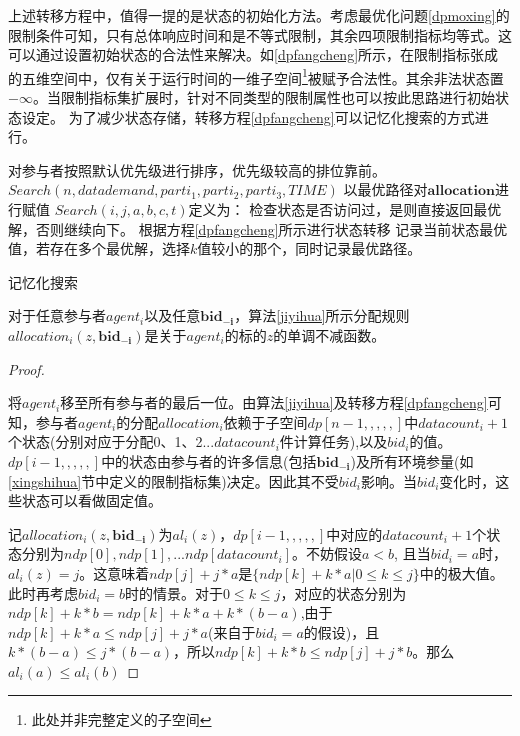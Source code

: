 \documentclass[promaster]{thesis-uestc}
\begin{document}
上述转移方程中，值得一提的是状态的初始化方法。考虑最优化问题\ref{dpmoxing}的限制条件可知，只有总体响应时间和是不等式限制，其余四项限制指标均等式。这可以通过设置初始状态的合法性来解决。如\ref{dpfangcheng}所示，在限制指标张成的五维空间中，仅有关于运行时间的一维子空间\footnote{此处并非完整定义的子空间}被赋予合法性。其余非法状态置$-\infty$。当限制指标集扩展时，针对不同类型的限制属性也可以按此思路进行初始状态设定。
为了减少状态存储，转移方程\ref{dpfangcheng}可以记忆化搜索的方式进行。

\begin{algorithm}[H]
    对参与者按照默认优先级进行排序，优先级较高的排位靠前。
    $Search(n,datademand,parti_1,parti_2,parti_3,TIME)$\;
    以最优路径对$\mathbf{allocation}$进行赋值\;
    \;
    $Search(i,j,a,b,c,t)$定义为：\;
    检查状态是否访问过，是则直接返回最优解，否则继续向下。\;
    根据方程\ref{dpfangcheng}所示进行状态转移\;
    记录当前状态最优值，若存在多个最优解，选择$k$值较小的那个，同时记录最优路径。\;
\caption{记忆化搜索}
\label{jiyihua}
\end{algorithm}

\begin{theorem}
对于任意参与者$agent_i$以及任意$\mathbf{bid_{-i}}$，算法\ref{jiyihua}所示分配规则$allocation_i(z,\mathbf{bid_{-i}})$是关于$agent_i$的标的$z$的单调不减函数。
\end{theorem}

\begin{proof}

\label{dpdandiao}

将$agent_i$移至所有参与者的最后一位。由算法\ref{jiyihua}及转移方程\ref{dpfangcheng}可知，参与者$agent_i$的分配$allocation_i$依赖于子空间$dp[n-1,,,,,]$中$datacount_i+1$个状态(分别对应于分配0、1、2...$datacount_i$件计算任务),以及$bid_i$的值。$dp[i-1,,,,,]$中的状态由参与者的许多信息(包括$\mathbf{bid_{-i}}$)及所有环境参量(如\ref{xingshihua}节中定义的限制指标集)决定。因此其不受$bid_i$影响。当$bid_i$变化时，这些状态可以看做固定值。

记$allocation_i(z,\mathbf{bid_{-i}})$为$al_i(z)$，$dp[i-1,,,,,]$中对应的$datacount_i+1$个状态分别为$ndp[0],ndp[1],...ndp[datacount_i]$。不妨假设$a < b$, 且当$bid_i = a$时，$al_i(z) = j$。这意味着$ndp[j]+j*a$是$\{ndp[k] + k*a|0 \leq k \leq j\}$中的极大值。此时再考虑$bid_i=b$时的情景。对于$ 0\leq k\leq j$，对应的状态分别为$ndp[k]+k*b=ndp[k]+k*a+k*(b-a)$,由于$ndp[k]+k*a\leq ndp[j]+j*a$(来自于$bid_i=a$的假设)，且$k*(b-a)\leq j*(b-a)$，所以$ndp[k]+k*b \leq ndp[j]+j*b$。那么$al_i(a)\leq al_i(b)$
\end{proof}
\end{document}

